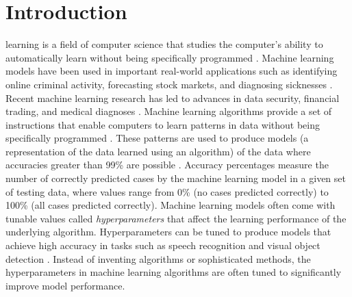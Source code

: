 



\section{Introduction} \label{introduction}

 learning is a field of computer science that studies the computer's ability to automatically learn without being specifically programmed \cite{Samuel:2000}. Machine learning models have been used in important real-world applications such as identifying online criminal activity, forecasting stock markets, and diagnosing sicknesses \cite{Buczak:2016,Heaton:2017,Muandet:2017}. Recent machine learning research has led to advances in data security, financial trading, and medical diagnoses \cite{Deng:2014,deBruijne:2016}. Machine learning algorithms provide a set of instructions that enable computers to learn patterns in data without being specifically programmed \cite{LeCun:2015}. These patterns are used to produce models (a representation of the data learned using an algorithm) of the data where accuracies greater than 99\% are possible \cite{Schmidhuber:2015}. Accuracy percentages measure the number of correctly predicted cases by the machine learning model in a given set of testing data, where values range from 0\% (no cases predicted correctly) to 100\% (all cases predicted correctly). Machine learning models often come with tunable values called \textit{hyperparameters} that affect the learning performance of the underlying algorithm. Hyperparameters can be tuned to produce models that achieve high accuracy in tasks such as speech recognition and visual object detection \cite{Deng:2013,Guo:2016,Bergstra:2011}. Instead of inventing algorithms or sophisticated methods, the hyperparameters in machine learning algorithms are often tuned to significantly improve model performance.

